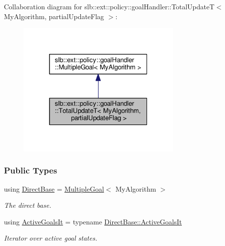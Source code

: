 Collaboration diagram for slb\+:\+:ext\+:\+:policy\+:\+:goal\+Handler\+:\+:Total\+UpdateT$<$ My\+Algorithm, partial\+Update\+Flag $>$\+:\nopagebreak
\begin{figure}[H]
\begin{center}
\leavevmode
\includegraphics[width=229pt]{structslb_1_1ext_1_1policy_1_1goalHandler_1_1TotalUpdateT__coll__graph}
\end{center}
\end{figure}
\subsubsection*{Public Types}
\begin{DoxyCompactItemize}
\item 
using \hyperlink{structslb_1_1ext_1_1policy_1_1goalHandler_1_1TotalUpdateT_a1e2cb7cd8f2f5206c53aece408069b3b}{Direct\+Base} = \hyperlink{structslb_1_1ext_1_1policy_1_1goalHandler_1_1MultipleGoal}{Multiple\+Goal}$<$ My\+Algorithm $>$\hypertarget{structslb_1_1ext_1_1policy_1_1goalHandler_1_1TotalUpdateT_a1e2cb7cd8f2f5206c53aece408069b3b}{}\label{structslb_1_1ext_1_1policy_1_1goalHandler_1_1TotalUpdateT_a1e2cb7cd8f2f5206c53aece408069b3b}

\begin{DoxyCompactList}\small\item\em The direct base. \end{DoxyCompactList}\item 
using \hyperlink{structslb_1_1ext_1_1policy_1_1goalHandler_1_1TotalUpdateT_a0bc580c69a1fc7beb7432961a72ecf0d}{Active\+Goals\+It} = typename \hyperlink{structslb_1_1ext_1_1policy_1_1goalHandler_1_1MultipleGoal_a6cbdf80decb53458becf058bbaae6971}{Direct\+Base\+::\+Active\+Goals\+It}\hypertarget{structslb_1_1ext_1_1policy_1_1goalHandler_1_1TotalUpdateT_a0bc580c69a1fc7beb7432961a72ecf0d}{}\label{structslb_1_1ext_1_1policy_1_1goalHandler_1_1TotalUpdateT_a0bc580c69a1fc7beb7432961a72ecf0d}

\begin{DoxyCompactList}\small\item\em Iterator over active goal states. \end{DoxyCompactList}\end{DoxyCompactItemize}
